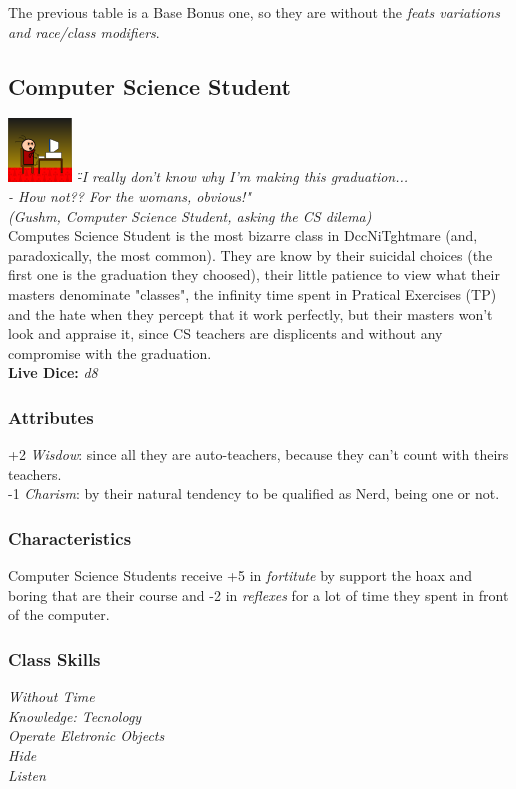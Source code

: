 \documentclass[ letterpaper,12pt]{article}
\begin{document}
The previous table is a Base Bonus one, so they are without the {\it feats variations and race/class modifiers}.\\

\subsection{Computer Science Student}
\includegraphics{../data/classes/Img/dcc.png}
{\it 
\"-I really don't know why I'm making this graduation...\\
- How not?? For the womans, obvious!"\\
(Gushm, Computer Science Student, asking the CS dilema)}\\

Computes Science Student is the most bizarre class in DccNiTghtmare (and,
paradoxically, the most common). They are know by their suicidal choices (the
first one is the graduation they choosed), their little patience to view what
their masters denominate "classes", the infinity time spent in Pratical
Exercises (TP) and the hate when they percept that it work perfectly, but their
masters won't look and appraise it, since CS teachers are displicents and
without any compromise with the graduation.\\

{\bf Live Dice:} {\it d8}

\subsubsection{Attributes}
+2 {\it Wisdow}: since all they are auto-teachers, because they can't count with theirs teachers.\\
-1 {\it Charism}: by their natural tendency to be qualified as Nerd, being one or not.

\subsubsection{Characteristics}
Computer Science Students receive +5 in {\it fortitute} by support the hoax and boring that are their course and -2 in {\it reflexes} for a lot of time they spent in front of the computer.

\subsubsection{Class Skills}
{\it
Without Time\\
Knowledge: Tecnology\\
Operate Eletronic Objects\\
Hide\\
Listen\\}
\end{document}

